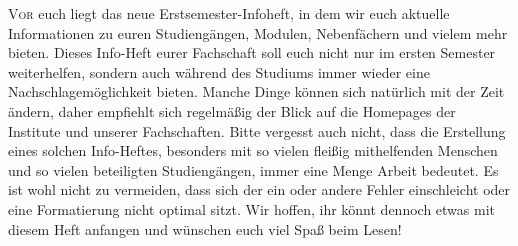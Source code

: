 \thispagestyle{plain}
\lettrine[lines=3,loversize=0.2,slope=-15,lhang=0.2]{V}{or} euch liegt das neue Erstsemester-Infoheft, in dem wir euch aktuelle Informationen zu euren Studiengängen, Modulen, Nebenfächern und vielem mehr bieten. Dieses Info-Heft eurer Fachschaft soll euch nicht nur im ersten Semester weiterhelfen, sondern auch während des Studiums immer wieder eine Nachschlagemöglichkeit bieten. Manche Dinge können sich natürlich mit der Zeit ändern, daher empfiehlt sich regelmäßig der Blick auf die Homepages der Institute und unserer Fachschaften. Bitte vergesst auch nicht, dass die Erstellung eines solchen Info-Heftes, besonders mit so vielen fleißig mithelfenden Menschen und so vielen beteiligten Studiengängen, immer eine Menge Arbeit bedeutet. Es ist wohl nicht zu vermeiden, dass sich der ein oder andere Fehler einschleicht oder eine Formatierung nicht optimal sitzt. Wir hoffen, ihr könnt dennoch etwas mit diesem Heft anfangen und wünschen euch viel Spaß beim Lesen!

